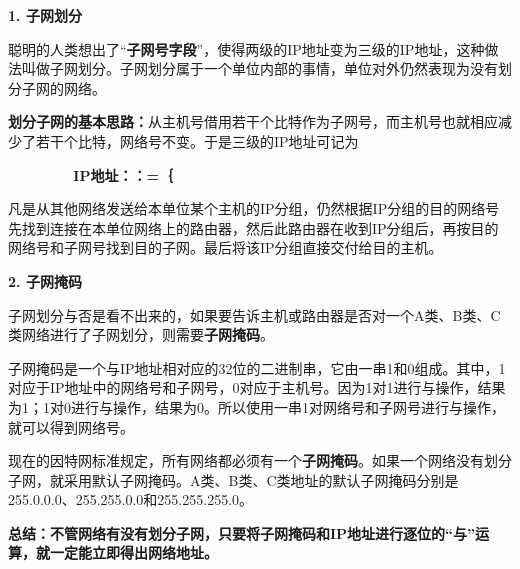 \textbf{{1. 子网划分}}

聪明的人类想出了``{\textbf{子网号字段}}''，使得两级的IP地址变为三级的IP地址，这种做法叫做子网划分。子网划分属于一个单位内部的事情，单位对外仍然表现为没有划分子网的网络。

\textbf{划分子网的基本思路：}从主机号借用若干个比特作为子网号，而主机号也就相应减少了若干个比特，网络号不变。于是三级的IP地址可记为

~ ~ ~ ~ ~ ~\textbf{IP地址：：=｛}

凡是从其他网络发送给本单位某个主机的IP分组，仍然根据IP分组的目的网络号先找到连接在本单位网络上的路由器，然后此路由器在收到IP分组后，再按目的网络号和子网号找到目的子网。最后将该IP分组直接交付给目的主机。

\textbf{{2. 子网掩码}}

子网划分与否是看不出来的，如果要告诉主机或路由器是否对一个A类、B类、C类网络进行了子网划分，则需要{\textbf{子网掩码}}。

子网掩码是一个与IP地址相对应的32位的二进制串，它由一串1和0组成。其中，1对应于IP地址中的网络号和子网号，0对应于主机号。因为1对1进行与操作，结果为1；1对0进行与操作，结果为0。所以使用一串1对网络号和子网号进行与操作，就可以得到网络号。

{现在的因特网标准规定，所有网络都必须有一个{\textbf{子网掩码}}。如果一个网络没有划分子网，就采用默认子网掩码。A类、B类、C类地址的默认子网掩码分别是255.0.0.0、255.255.0.0和255.255.255.0。}

\textbf{{总结：}{不管网络有没有划分子网，只要将子网掩码和IP地址进行逐位的``与''运算，就一定能立即得出网络地址。}}

